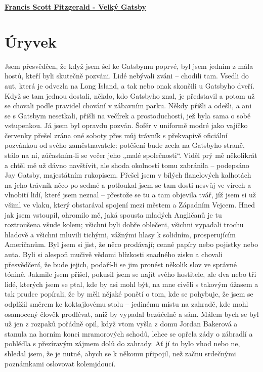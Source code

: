 \documentclass[11pt]{article}
\begin{document}
    \begin{center}
        \underline{\textbf{\Huge Francis Scott Fitzgerald - Velký Gatsby}}
    \end{center}
    \section*{Úryvek}
    Jsem přesvědčen, že když jsem šel ke Gatsbymu
poprvé, byl jsem jedním z mála hostů, kteří byli skutečně
pozváni. Lidé nebývali zváni – chodili tam. Vsedli do
aut, která je odvezla na Long Island, a tak nebo onak
skončili u Gatsbyho dveří. Když se tam jednou dostali,
někdo, kdo Gatsbyho znal, je představil a potom už se
chovali podle pravidel chování v zábavním parku. Někdy
přišli a odešli, a ani se s Gatsbym nesetkali, přišli na
večírek a prostoduchostí, jež byla sama o sobě
vstupenkou.
Já jsem byl opravdu pozván. Šofér v uniformě
modré jako vajíčko červenky přešel zrána oné soboty
přes můj trávník s překvapivě oficiální pozvánkou od
svého zaměstnavatele: potěšení bude zcela na Gatsbyho
straně, stálo na ní, zúčastním-li se večer jeho „malé
společnosti“. Viděl prý mě několikrát a chtěl mě už
dávno navštívit, ale shoda okolností tomu zabránila –
podepsáno Jay Gatsby, majestátním rukopisem.
Přešel jsem v bílých flanelových kalhotách na jeho
trávník něco po sedmé a potloukal jsem se tam dosti
nesvůj ve vírech a vlnobití lidí, které jsem neznal –
přestože se tu a tam objevila tvář, jíž jsem si už všiml ve
vlaku, který obstarával spojení mezi městem a Západním
Vejcem. Hned jak jsem vstoupil, ohromilo mě, jaká
spousta mladých Angličanů je tu roztroušena všude
kolem; všichni byli dobře oblečeni, všichni vypadali
trochu hladově a všichni mluvili tichými, vážnými hlasy
k solidním, prosperujícím Američanům. Byl jsem si jist,
že něco prodávají; cenné papíry nebo pojistky nebo auta.
Byli si alespoň mučivě vědomi blízkosti snadného zisku
a chovali přesvědčení, že bude jejich, podaří-li se jim
pronést několik slov ve správné tónině.
Jakmile jsem přišel, pokusil jsem se najít svého
hostitele, ale dva nebo tři lidé, kterých jsem se ptal, kde
by asi mohl být, na mne civěli s takovým úžasem a tak
prudce popírali, že by měli nějaké ponětí o tom, kde se
pohybuje, že jsem se odplížil směrem ke koktajlovému
stolu – jedinému místu na zahradě, kde mohl osamocený
člověk prodlévat, aniž by vypadal bezúčelně a sám.
Málem bych se byl už jen z rozpaků pořádně opil,
když vtom vyšla z domu Jordan Bakerová a stanula na
horním konci mramorových schodů, lehce se opřela zády
o zábradlí a pohlédla s přezíravým zájmem dolů do
zahrady.
Ať jí to bylo vhod nebo ne, shledal jsem, že je nutné,
abych se k někomu připojil, než začnu srdečnými
poznámkami oslovovat kolemjdoucí.
\end{document}

